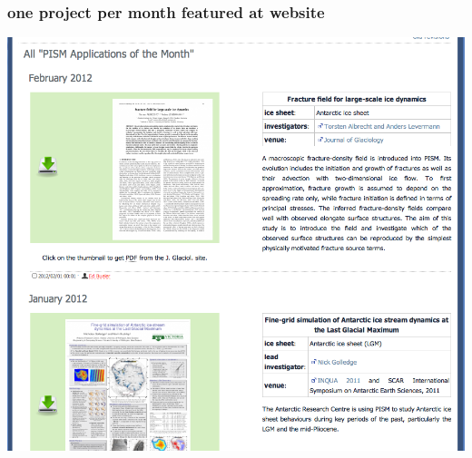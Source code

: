 \documentclass[hide notes,intlimits]{beamer}
\begin{document}
\begin{frame}
  \frametitle{one project per month featured at website}
  \begin{center}
    \includegraphics[height=0.75\textheight]{application-of-the-month.png}
  \end{center}
\end{frame}
\end{document}
